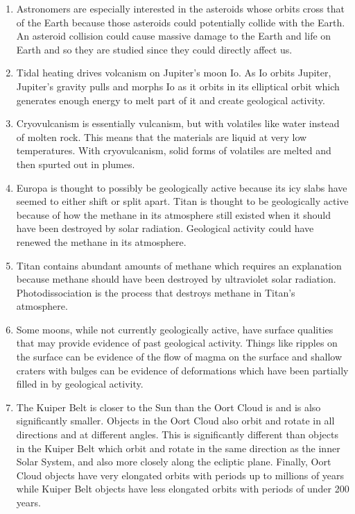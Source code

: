 \documentclass[../hw2.tex]{subfiles}
\begin{document}
    \begin{enumerate}
        \item Astronomers are especially interested in the asteroids whose orbits cross that of the Earth because those asteroids could potentially collide with the Earth. An asteroid collision could cause massive damage to the Earth and life on Earth and so they are studied since they could directly affect us.
        \item Tidal heating drives volcanism on Jupiter's moon Io. As Io orbits Jupiter, Jupiter's gravity pulls and morphs Io as it orbits in its elliptical orbit which generates enough energy to melt part of it and create geological activity. 
        \item Cryovulcanism is essentially vulcanism, but with volatiles like water instead of molten rock. This means that the materials are liquid at very low temperatures. With cryovulcanism, solid forms of volatiles are melted and then spurted out in plumes.
        \item Europa is thought to possibly be geologically active because its icy slabs have seemed to either shift or split apart. Titan is thought to be geologically active because of how the methane in its atmosphere still existed when it should have been destroyed by solar radiation. Geological activity could have renewed the methane in its atmosphere.
        \item Titan contains abundant amounts of methane which requires an explanation because methane should have been destroyed by ultraviolet solar radiation. Photodissociation is the process that destroys methane in Titan's atmosphere.  
        \item Some moons, while not currently geologically active, have surface qualities that may provide evidence of past geological activity. Things like ripples on the surface can be evidence of the flow of magma on the surface and shallow craters with bulges can be evidence of deformations which have been partially filled in by geological activity.
        \item The Kuiper Belt is closer to the Sun than the Oort Cloud is and is also significantly smaller. Objects in the Oort Cloud also orbit and rotate in all directions and at different angles. This is significantly different than objects in the Kuiper Belt which orbit and rotate in the same direction as the inner Solar System, and also more closely along the ecliptic plane. Finally, Oort Cloud objects have very elongated orbits with periods up to millions of years while Kuiper Belt objects have less elongated orbits with periods of under 200 years.

\end{enumerate}
\end{document}
